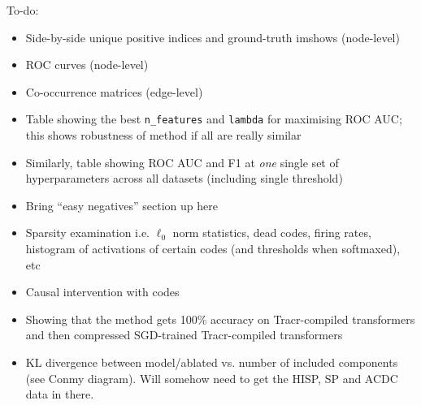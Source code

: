 \documentclass[11pt]{scrartcl}
\begin{document}
\color{green}
To-do:
\begin{itemize}
\item Side-by-side unique positive indices and ground-truth imshows (node-level)
\item ROC curves (node-level)
\item Co-occurrence matrices (edge-level)
\item Table showing the best \texttt{n\_features} and \texttt{lambda} for maximising ROC AUC; this shows robustness of method if all are really similar
\item Similarly, table showing ROC AUC and F1 at \textit{one} single set of hyperparameters across all datasets (including single threshold)
\item Bring ``easy negatives'' section up here
\item Sparsity examination i.e. $\ell_0$ norm statistics, dead codes, firing rates, histogram of activations of certain codes (and thresholds when softmaxed), etc
\item Causal intervention with codes
\item Showing that the method gets 100\% accuracy on Tracr-compiled transformers and then compressed SGD-trained Tracr-compiled transformers
\item KL divergence between model/ablated vs. number of included components (see Conmy diagram). Will somehow need to get the HISP, SP and ACDC data in there. 
\end{itemize}
\color{black}



\printbibliography %
\end{document}
